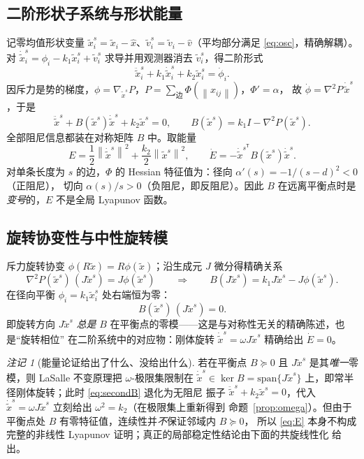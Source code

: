 \documentclass[11pt,a4paper]{ctexart}
\theoremstyle{plain}
\theoremstyle{definition}
\theoremstyle{remark}
\newtheorem{remark}{注记}
\newcommand{\bx}{\widehat{x}}
\newcommand{\bv}{\widehat{v}}
\newcommand{\txi}{\tilde{x}}
\newcommand{\tv}{\tilde{v}}
\newcommand{\ts}{\tilde{x}^{s}}
\newcommand{\tvs}{\tilde{v}^{s}}
\newcommand{\norm}[1]{\left\|#1\right\|}
\begin{document}
\subsection{二阶形状子系统与形状能量}
记零均值形状变量 $\ts_i=\txi_i-\bx$、$\tvs_i=\tv_i-\bv$（平均部分满足 \eqref{eq:osc}，精确解耦）。
对 $\dot\ts_i=\phi_i-k_1\ts_i+\tvs_i$ 求导并用观测器消去 $\tvs_i$，得二阶形式
\begin{equation}
  \ddot\ts_i+k_1\dot\ts_i+k_2\ts_i=\dot\phi_i .
\end{equation}
因斥力是势的梯度，$\phi=\nabla_{\ts}P$，$P=\sum_{\text{边}}\Phi(\norm{x_{ij}})$，$\Phi'=\alpha$，
故 $\dot\phi=\nabla^2P\,\dot\ts$，于是
\begin{equation}
  \boxed{\;\ddot\ts+B(\ts)\dot\ts+k_2\ts=0,\qquad B(\ts)=k_1I-\nabla^2P(\ts).\;}
  \label{eq:secondB}
\end{equation}
全部阻尼信息都装在对称矩阵 $B$ 中。取能量
\begin{equation}
  E=\frac12\norm{\dot\ts}^2+\frac{k_2}{2}\norm{\ts}^2 ,
  \qquad
  \dot E=-\dot\ts^{\mathsf T}B(\ts)\dot\ts .
  \label{eq:E}
\end{equation}
对单条长度为 $s$ 的边，$\Phi$ 的 Hessian 特征值为：径向 $\alpha'(s)=-1/(s-d)^2<0$（正阻尼），
切向 $\alpha(s)/s>0$（负阻尼，即反阻尼）。因此 $B$ 在远离平衡点时是\emph{变号}的，$E$ 不是全局
Lyapunov 函数。

\subsection{旋转协变性与中性旋转模}
斥力旋转协变 $\phi(R\txi)=R\phi(\txi)$；沿生成元 $J$ 微分得精确关系
\begin{equation}
  \nabla^2P(\ts)\,(J\ts)=J\phi(\ts)
  \qquad\Longrightarrow\qquad
  B(J\ts)=k_1J\ts-J\phi(\ts).
  \label{eq:rotcov}
\end{equation}
在径向平衡 $\phi_i=k_1\ts_i$ 处右端恒为零：
\begin{equation}
  \boxed{\;B(\ts)\,(J\ts)=0.\;}
  \label{eq:nullB}
\end{equation}
即旋转方向 $J\ts$ \emph{总是} $B$ 在平衡点的零模——这是与对称性无关的精确陈述，也是“旋转相位”
在二阶系统中的对应物：刚体旋转 $\dot\ts=\omega J\ts$ 精确给出 $\dot E=0$。

\begin{remark}[能量论证给出了什么、没给出什么]
若在平衡点 $B\succeq0$ 且 $J\ts$ 是其\emph{唯一}零模，则 LaSalle 不变原理把 $\omega$-极限集限制在
$\dot\ts\in\ker B=\mathrm{span}\{J\ts\}$ 上，即常半径刚体旋转；此时 \eqref{eq:secondB} 退化为无阻尼
振子 $\ddot\ts+k_2\ts=0$，代入 $\dot\ts=\omega J\ts$ 立刻给出 $\omega^2=k_2$（在极限集上重新得到
命题~\ref{prop:omega}）。但由于平衡点处 $B$ 有零特征值，连续性并\emph{不}保证邻域内 $B\succeq0$，
所以 \eqref{eq:E} 本身不构成完整的非线性 Lyapunov 证明；真正的局部稳定性结论由下面的共旋线性化
给出。
\end{remark}
\end{document}

